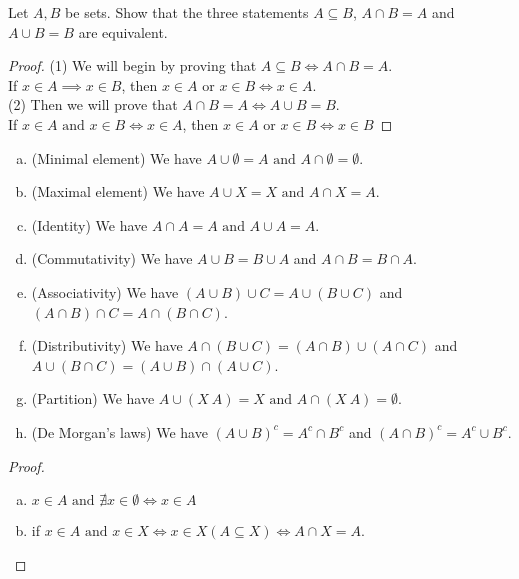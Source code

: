 \begin{exercise}
  Let $A, B$ be sets. Show that the three statements $A \subseteq B$, $A \cap B = A$ and $A \cup B = B$ are equivalent.
\end{exercise}
\begin{proof}
  (1) We will begin by proving that $A \subseteq B \iff A \cap B = A$. \\
  If $x \in A \implies x \in B$, then $x \in A \text{\ or\ } x \in B \iff x \in A$. \\
  (2) Then we will prove that $A \cap B = A \iff A \cup B = B$. \\
  If $x \in A \text{\ and\ } x \in B \iff x \in A$, then $x \in A \text{\ or\ } x \in B \iff x \in B$
\end{proof}

\begin{exercise}
  \begin{enumerate}[(a)]
    \item (Minimal element) We have $A \cup \emptyset = A \text{\ and\ } A \cap \emptyset = \emptyset$.
    \item (Maximal element) We have $A \cup X = X \text{\ and\ } A \cap X = A$.
    \item (Identity) We have $A \cap A = A \text{\ and\ } A \cup A = A$.
    \item (Commutativity) We have $A \cup B = B \cup A$ and $A \cap B = B \cap A$.
    \item (Associativity) We have $(A \cup B) \cup C = A \cup (B \cup C)$ and $(A \cap B) \cap C = A \cap (B \cap C)$. 
    \item (Distributivity) We have $A \cap (B \cup C) = (A \cap B) \cup (A \cap C)$ and $A \cup (B \cap C) = (A \cup B) \cap (A \cup C)$. 
    \item (Partition) We have $A \cup (X \ A) = X \text{\ and\ } A \cap (X \ A) = \emptyset$. 
    \item (De Morgan's laws) We have $(A \cup B)^c = A^c \cap B^c$ and $(A \cap B)^c = A^c \cup B^c$.
  \end{enumerate}
\end{exercise}
\begin{proof}
\begin{enumerate}[(a)]
  \item $x \in A \text{\ and\ } \nexists x \in \emptyset \iff x \in A$
  \item if $x \in A \text{\ and\ } x \in X \iff x \in X (A \subseteq X) \iff A \cap X = A$.
\end{enumerate}
\end{proof}
